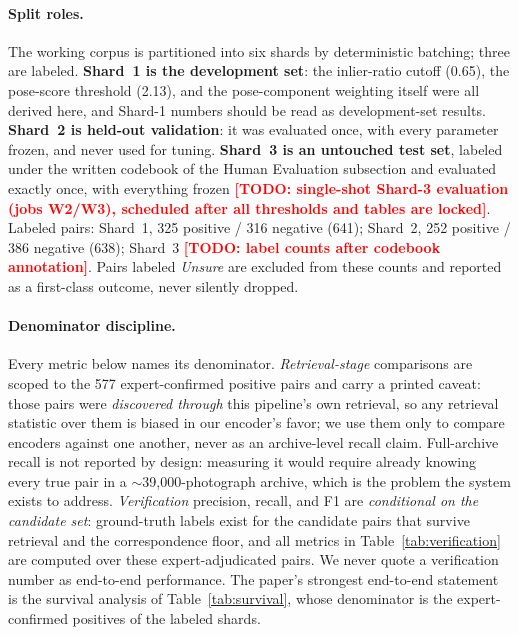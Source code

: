 \documentclass[letterpaper]{article} %
\newcommand{\todo}[1]{\textcolor{red}{\textbf{[TODO: #1]}}}
\begin{document}
\paragraph{Split roles.}
The working corpus is partitioned into six shards by deterministic
batching; three are labeled. \textbf{Shard~1 is the development set}: the
inlier-ratio cutoff (0.65), the pose-score threshold (2.13), and the
pose-component weighting itself were all derived here, and Shard-1 numbers
should be read as development-set results. \textbf{Shard~2 is held-out
validation}: it was evaluated once, with every parameter frozen, and never
used for tuning. \textbf{Shard~3 is an untouched test set}, labeled under
the written codebook of the Human Evaluation subsection and evaluated
exactly once, with everything frozen \todo{single-shot Shard-3 evaluation
(jobs W2/W3), scheduled after all thresholds and tables are locked}.
Labeled pairs: Shard~1, 325 positive / 316 negative (641); Shard~2, 252
positive / 386 negative (638); Shard~3 \todo{label counts after codebook
annotation}. Pairs labeled \emph{Unsure} are excluded from these counts and
reported as a first-class outcome, never silently dropped.

\paragraph{Denominator discipline.}
Every metric below names its denominator. \emph{Retrieval-stage} comparisons
are scoped to the 577 expert-confirmed positive pairs and carry a printed
caveat: those pairs were \emph{discovered through} this pipeline's own
retrieval, so any retrieval statistic over them is biased in our encoder's
favor; we use them only to compare encoders against one another, never as an
archive-level recall claim. Full-archive recall is not reported by design:
measuring it would require already knowing every true pair in a
$\sim$39{,}000-photograph archive, which is the problem the system exists to
address. \emph{Verification} precision, recall, and F1 are \emph{conditional
on the candidate set}: ground-truth labels exist for the candidate pairs
that survive retrieval and the correspondence floor, and all metrics in
Table~\ref{tab:verification} are computed over these expert-adjudicated
pairs. We never quote a verification number as end-to-end performance. The
paper's strongest end-to-end statement is the survival analysis of
Table~\ref{tab:survival}, whose denominator is the expert-confirmed
positives of the labeled shards.
\end{document}
